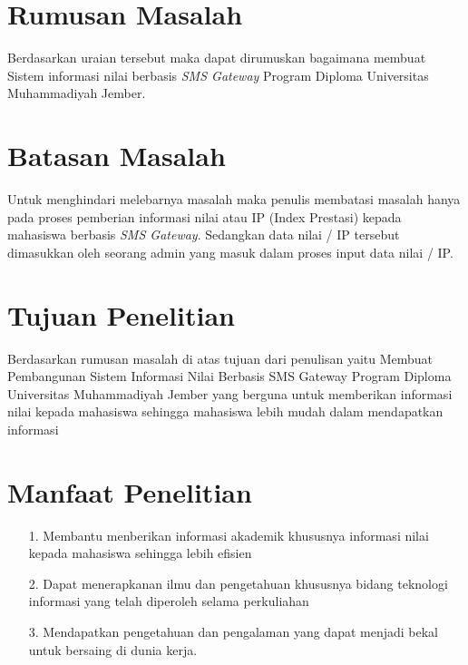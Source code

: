 \documentclass{jtetiproposalskripsi}
\begin{document}
\section{Rumusan Masalah}
Berdasarkan uraian tersebut maka dapat dirumuskan bagaimana membuat Sistem informasi nilai berbasis \textit{SMS Gateway} Program Diploma Universitas Muhammadiyah Jember.

\section{Batasan Masalah}
Untuk menghindari melebarnya masalah maka penulis membatasi masalah hanya pada proses pemberian informasi nilai atau IP (Index Prestasi) kepada mahasiswa berbasis \textit{SMS Gateway}. Sedangkan data nilai / IP tersebut dimasukkan oleh seorang admin yang masuk dalam proses input data nilai / IP.

\section{Tujuan Penelitian}
Berdasarkan rumusan masalah di atas tujuan dari penulisan yaitu Membuat Pembangunan Sistem Informasi Nilai Berbasis SMS Gateway Program Diploma Universitas Muhammadiyah Jember yang berguna untuk memberikan informasi nilai kepada mahasiswa sehingga mahasiswa lebih mudah dalam mendapatkan informasi

\section{Manfaat Penelitian}

\begin{itemize}
\item[1.]Membantu menberikan informasi akademik khususnya informasi nilai kepada mahasiswa sehingga lebih efisien 
\item[2.]Dapat menerapkanan ilmu dan pengetahuan khususnya bidang teknologi informasi yang telah diperoleh selama perkuliahan 
\item[3.]Mendapatkan pengetahuan dan pengalaman yang dapat menjadi bekal untuk  bersaing di dunia kerja.

\end{itemize}
\end{document}
